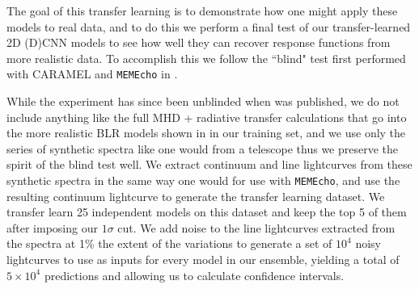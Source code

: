 \documentclass[floatfix,twocolumn,trackchanges,linenumbers]{aastex7}
\begin{document}
The goal of this transfer learning is to demonstrate how one might apply these models to real data, and to do this we perform a final test of our transfer-learned 2D (D)CNN models to see how well they can recover response functions from more realistic data. To accomplish this we follow the ``blind" test first performed with CARAMEL and \texttt{MEMEcho} in \cite{Mangham2019}. 

While the experiment has since been unblinded when \cite{Mangham2019} was published, we do not include anything like the full MHD + radiative transfer calculations that go into the more realistic BLR models shown in \cite{Mangham2019} in our training set, and we use only the series of synthetic spectra like one would from a telescope thus we preserve the spirit of the blind test well. We extract continuum and line lightcurves from these synthetic spectra in the same way one would for use with \texttt{MEMEcho}, and use the resulting continuum lightcurve to generate the transfer learning dataset. We transfer learn 25 independent models on this dataset and keep the top 5 of them after imposing our $1 \sigma$ cut. We add noise to the line lightcurves extracted from the \cite{Mangham2019} spectra at 1\% the extent of the variations to generate a set of $10^4$ noisy lightcurves to use as inputs for every model in our ensemble, yielding a total of $5\times10^4$ predictions and allowing us to calculate confidence intervals.
\end{document}

